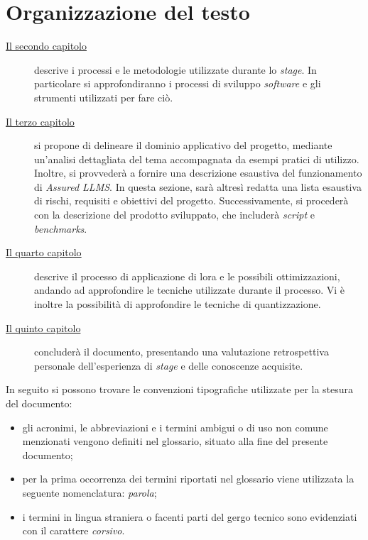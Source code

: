 \section{Organizzazione del testo}
\begin{description}
    \item[{\hyperref[chap:processi-metodologie]{Il secondo capitolo}}] descrive i processi e le metodologie utilizzate durante lo \textit{stage}. In particolare si approfondiranno i processi di sviluppo \textit{software} e gli strumenti utilizzati per fare ciò.
    
    \item[{\hyperref[chap:descrizione-stage-1]{Il terzo capitolo}}] si propone di delineare il dominio applicativo del progetto, mediante un'analisi dettagliata del tema accompagnata da esempi pratici di utilizzo. 
    Inoltre, si provvederà a fornire una descrizione esaustiva del funzionamento di \textit{Assured LLMS}. 
    In questa sezione, sarà altresì redatta una lista esaustiva di rischi, requisiti e obiettivi del progetto. 
    Successivamente, si procederà con la descrizione del prodotto sviluppato, che includerà \textit{script} e \textit{benchmarks}. 

    \item[{\hyperref[chap:descrizione-stage-2]{Il quarto capitolo}}] descrive il processo di applicazione di \gls{lora} e le possibili ottimizzazioni, andando ad approfondire le tecniche utilizzate durante il processo. Vi è inoltre la possibilità di approfondire le tecniche di quantizzazione.

    \item[{\hyperref[chap:conclusioni]{Il quinto capitolo}}] concluderà il documento, presentando una valutazione retrospettiva personale dell'esperienza di \textit{stage} e delle conoscenze acquisite.
    
\end{description}

In seguito si possono trovare le convenzioni tipografiche utilizzate per la stesura del documento:
\begin{itemize}
	\item gli acronimi, le abbreviazioni e i termini ambigui o di uso non comune menzionati vengono definiti nel glossario, situato alla fine del presente documento;
	\item per la prima occorrenza dei termini riportati nel glossario viene utilizzata la seguente nomenclatura: \textit{parola}\glox\gloxspacing;
	\item i termini in lingua straniera o facenti parti del gergo tecnico sono evidenziati con il carattere \textit{corsivo}.
\end{itemize}

\newpage